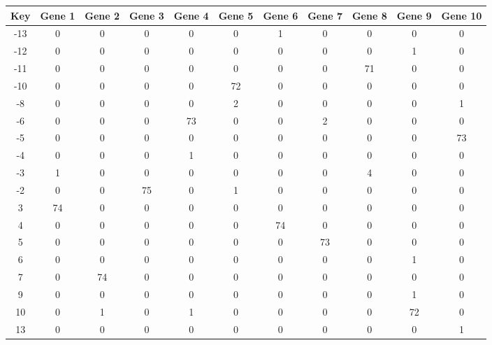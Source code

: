 \begin{tabular}{|c|c|c|c|c|c|c|c|c|c|c|}
\hline
Key & Gene 1 & Gene 2 & Gene 3 & Gene 4 & Gene 5 & Gene 6 & Gene 7 & Gene 8 & Gene 9 & Gene 10 \\
\hline
-13 & 0 & 0 & 0 & 0 & 0 & 1 & 0 & 0 & 0 & 0 \\
-12 & 0 & 0 & 0 & 0 & 0 & 0 & 0 & 0 & 1 & 0 \\
-11 & 0 & 0 & 0 & 0 & 0 & 0 & 0 & 71 & 0 & 0 \\
-10 & 0 & 0 & 0 & 0 & 72 & 0 & 0 & 0 & 0 & 0 \\
-8 & 0 & 0 & 0 & 0 & 2 & 0 & 0 & 0 & 0 & 1 \\
-6 & 0 & 0 & 0 & 73 & 0 & 0 & 2 & 0 & 0 & 0 \\
-5 & 0 & 0 & 0 & 0 & 0 & 0 & 0 & 0 & 0 & 73 \\
-4 & 0 & 0 & 0 & 1 & 0 & 0 & 0 & 0 & 0 & 0 \\
-3 & 1 & 0 & 0 & 0 & 0 & 0 & 0 & 4 & 0 & 0 \\
-2 & 0 & 0 & 75 & 0 & 1 & 0 & 0 & 0 & 0 & 0 \\
3 & 74 & 0 & 0 & 0 & 0 & 0 & 0 & 0 & 0 & 0 \\
4 & 0 & 0 & 0 & 0 & 0 & 74 & 0 & 0 & 0 & 0 \\
5 & 0 & 0 & 0 & 0 & 0 & 0 & 73 & 0 & 0 & 0 \\
6 & 0 & 0 & 0 & 0 & 0 & 0 & 0 & 0 & 1 & 0 \\
7 & 0 & 74 & 0 & 0 & 0 & 0 & 0 & 0 & 0 & 0 \\
9 & 0 & 0 & 0 & 0 & 0 & 0 & 0 & 0 & 1 & 0 \\
10 & 0 & 1 & 0 & 1 & 0 & 0 & 0 & 0 & 72 & 0 \\
13 & 0 & 0 & 0 & 0 & 0 & 0 & 0 & 0 & 0 & 1 \\
\hline
\end{tabular}